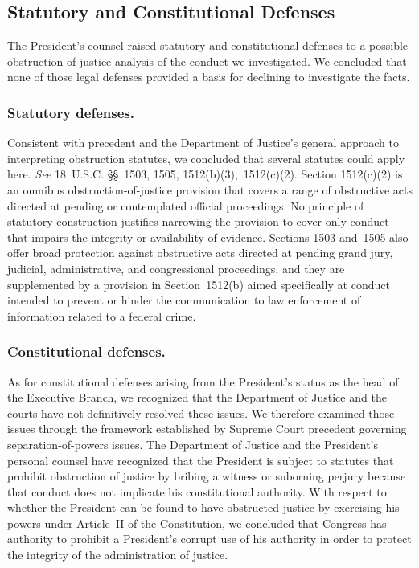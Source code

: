 \subsection*{Statutory and Constitutional Defenses}

The President's counsel raised statutory and constitutional defenses to a possible obstruction-of-justice analysis of the conduct we investigated.
We concluded that none of those legal defenses provided a basis for declining to investigate the facts.

\subsubsection*{Statutory defenses.}

Consistent with precedent and the Department of Justice's general approach to interpreting obstruction statutes, we concluded that several statutes could apply here.
\textit{See} 18~U.S.C. \S\S~1503, 1505, 1512(b)(3),~1512(c)(2).
Section 1512(c)(2) is an omnibus obstruction-of-justice provision that covers a range of obstructive acts directed at pending or contemplated official proceedings.
No principle of statutory construction justifies narrowing the provision to cover only conduct that impairs the integrity or availability of evidence.
Sections 1503 and~1505 also offer broad protection against obstructive acts directed at pending grand jury, judicial, administrative, and congressional proceedings, and they are supplemented by a provision in Section~1512(b) aimed specifically at conduct intended to prevent or hinder the communication to law enforcement of information related to a federal crime.

\subsubsection*{Constitutional defenses.}

As for constitutional defenses arising from the President's status as the head of the Executive Branch, we recognized that the Department of Justice and the courts have not definitively resolved these issues.
We therefore examined those issues through the framework established by Supreme Court precedent governing separation-of-powers issues.
The Department of Justice and the President's personal counsel have recognized that the President is subject to statutes that prohibit obstruction of justice by bribing a witness or suborning perjury because that conduct does not implicate his constitutional authority.
With respect to whether the President can be found to have obstructed justice by exercising his powers under Article~II of the Constitution, we concluded that Congress has authority to prohibit a President's corrupt use of his authority in order to protect the integrity of the administration of justice.

